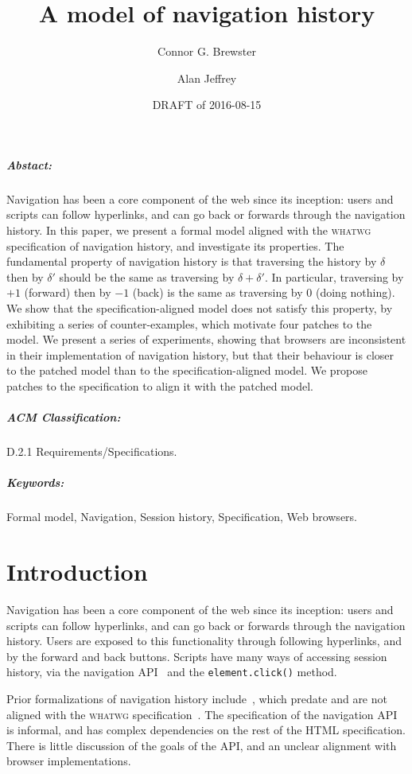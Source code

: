 \documentclass{notes}
\title{A model of navigation history}
\author{Connor G. Brewster \and Alan Jeffrey}
\date{DRAFT of 2016-08-15}
\begin{document}
\maketitle

\subparagraph{Abstact:}
Navigation has been a core component of the web since its inception:
users and scripts can follow hyperlinks, and can go back or forwards
through the navigation history. In this paper, we present a formal
model aligned with the \textsc{whatwg} specification of navigation
history, and investigate its properties. The fundamental property of
navigation history is that traversing the history by $\delta$ then by
$\delta'$ should be the same as traversing by $\delta+\delta'$. In
particular, traversing by $+1$ (forward) then by $-1$ (back) is the
same as traversing by $0$ (doing nothing). We show that the
specification-aligned model does not satisfy this property, by
exhibiting a series of counter-examples, which motivate four patches
to the model. We present a series of experiments, showing that
browsers are inconsistent in their implementation of navigation
history, but that their behaviour is closer to the patched model than
to the specification-aligned model. We propose patches to the
specification to align it with the patched model.

\subparagraph{ACM Classification:}
D.2.1 Requirements/Specifications.

\subparagraph{Keywords:}
Formal model,
Navigation,
Session history,
Specification,
Web browsers.

\section{Introduction}

Navigation has been a core component of the web since its inception:
users and scripts can follow hyperlinks, and can go back or forwards
through the navigation history. Users are exposed to this functionality
through following hyperlinks, and by the forward and back buttons.
Scripts have many ways of accessing session history, via the
navigation API~\cite[\S7.7]{whatwg} and the \verb|element.click()| method.

Prior formalizations of navigation history
include~\cite{HH:2006,Haydar:2004,HPS:2004,LHYT:2000,WP:2003}, which
predate and are not aligned with the \textsc{whatwg}
specification~\cite{whatwg}.  The specification of the navigation API
is informal, and has complex dependencies on the rest of the HTML
specification. There is little discussion of the goals
of the API, and an unclear alignment with browser implementations.
\end{document}
